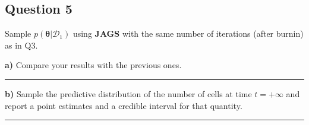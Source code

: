 \subsection*{Question 5}

Sample $p(\bm{\theta}|\mathcal{D}_1)$ using \textbf{JAGS} with the same number of iterations (after burnin) as in Q3.

\textbf{a)} Compare your results with the previous ones.

\begin{center}\rule{6cm}{0.4pt}\end{center}

\textbf{b)} Sample the predictive distribution of the number of cells at time $t = +\infty$ and report a point estimates and a credible interval for that quantity.

\begin{center}\rule{6cm}{0.4pt}\end{center}

